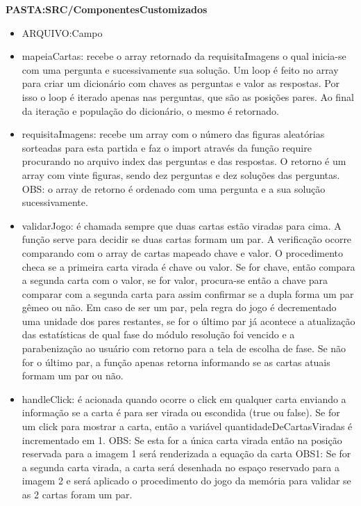 \textbf{PASTA:SRC/ComponentesCustomizados}
\begin{itemize}
\item ARQUIVO:Campo

	\item mapeiaCartas: recebe o array retornado da requisitaImagens o qual inicia-se com uma pergunta e sucessivamente sua solução. Um loop é feito no array para criar um dicionário com chaves as perguntas e valor as respostas. Por isso o loop é iterado apenas nas perguntas, que são as posições pares. Ao final da iteração e população do dicionário, o mesmo é retornado.
	
	\item requisitaImagens: recebe um array com o número das figuras aleatórias sorteadas para esta partida e faz o import através da função require procurando no arquivo index das perguntas e das respostas. O retorno é um array com vinte figuras, sendo dez perguntas e dez soluções das perguntas. OBS: o array de retorno é ordenado com uma pergunta e a sua solução sucessivamente.

	\item validarJogo: é chamada sempre que duas cartas estão viradas para cima. A função serve para decidir se duas cartas formam um par. A verificação ocorre comparando com o array de cartas mapeado chave e valor. O procedimento checa se a primeira carta virada é chave ou valor. Se for chave, então compara a segunda carta com o valor, se for valor, procura-se então a chave para comparar com a segunda carta para assim confirmar se a dupla forma um par gêmeo ou não. Em caso de ser um par, pela regra do jogo é decrementado uma unidade dos pares restantes, se for o último par já acontece a atualização das estatísticas de qual fase do módulo resolução foi vencido e a parabenização ao usuário com retorno para a tela de escolha de fase. Se não for o último par, a função apenas retorna informando se as cartas atuais formam um par ou não.

	\item handleClick: é acionada quando ocorre o click em qualquer carta enviando a informação se a carta é para ser virada ou escondida (true ou false). Se for um click para mostrar a carta, então a variável quantidadeDeCartasViradas é incrementado em 1. 
	OBS: Se esta for a única carta virada então na posição reservada para a imagem 1 será renderizada a equação da carta
	OBS1: Se for a segunda carta virada, a carta será desenhada no espaço reservado para a imagem 2 e será aplicado o procedimento do jogo da memória para validar se as 2 cartas foram um par. 


\end{itemize}
